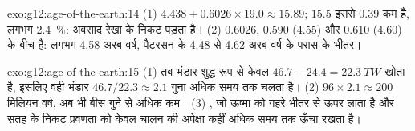 \begin{solution}{exo:g12:age-of-the-earth:14}
(1) $4.438 + 0.6026 \times 19.0 \approx 15.89$; $15.5$ इससे $0.39$ कम है,
लगभग \qty{2.4}{\percent}: अवसाद रेखा के निकट पड़ता है। (2) 0.6026,
0.590 (4.55) और 0.610 (4.60) के बीच है: लगभग 4.58 अरब वर्ष, पैटरसन के
4.48 से 4.62 अरब वर्ष के परास के भीतर।
\end{solution}

\begin{solution}{exo:g12:age-of-the-earth:15}
(1) तब भंडार शुद्ध रूप से केवल $46.7 - 24.4 = \qty{22.3}{TW}$ खोता है, इसलिए वही
भंडार $46.7/22.3 \approx 2.1$ गुना अधिक समय तक चलता है। (2) $96 \times 2.1 \approx
200$ मिलियन वर्ष, अब भी बीस गुने से अधिक कम। (3) , जो ऊष्मा को गहरे भीतर से ऊपर लाता है और सतह के निकट प्रवणता को
केवल चालन की अपेक्षा कहीं अधिक समय तक ऊँचा रखता है।
\end{solution}

